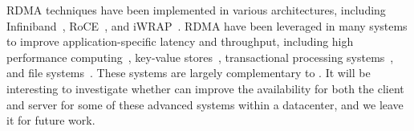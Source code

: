 % 
% 






 RDMA techniques have been implemented in various 
architectures, including Infiniband~\cite{infiniband}, RoCE~\cite{roce}, and 
iWRAP~\cite{iwrap}. RDMA have been leveraged in many systems to improve 
application-specific latency and throughput, including high performance 
computing~\cite{openmpi}, key-value 
stores~\cite{pilaf:usenix14,herd:sigcomm14,farm:nsdi14,memcached:rdma}, 
transactional processing systems~\cite{drtm:sosp15,farm:sosp15}, and file 
systems~\cite{gibson:nfs}. These systems are largely complementary to \xxx. It 
will be interesting to investigate whether \xxx can improve the availability for 
both the client and server for some of these advanced systems within a 
datacenter, and we leave it for future work.

